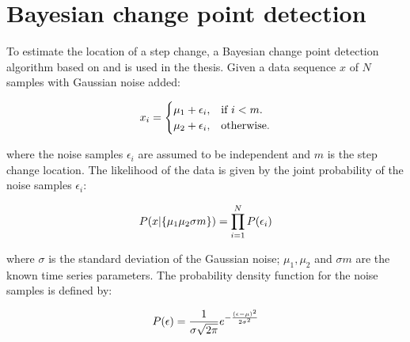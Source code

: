 \chapter{Bayesian change point detection}
\label{appendix:appendix_1} 


To estimate the location of a step change, a Bayesian change point detection algorithm based on \cite{Ruanaidh1996} and \cite{adams2007bayesian} is used in the thesis. Given a data sequence $x$ of $N$ samples with Gaussian noise added:

\begin{equation}
    \centering
      x_i=\begin{cases}
          \mu_1 + \epsilon_i, & \text{if $i<m$}.\\
          \mu_2 + \epsilon_i, & \text{otherwise}.
          \end{cases}
    \label{eq:app:cp:5.1}
\end{equation}

where the noise samples $\epsilon_i$ are assumed to be independent and $m$ is the step change location. The likelihood of the data is given by the joint probability of the noise samples $\epsilon_i$: 

\begin{equation}
    \centering
    P(x|\{\mu_1\mu_2\sigma m\}) = \prod\limits_{i=1}^N P(\epsilon_i)
    \label{eq:app:cp:5.2}
\end{equation}

where $\sigma$ is the standard deviation of the Gaussian noise;  $\mu_1, \mu_2$ and $\sigma m$ are the known time series parameters. The probability density function for the noise samples is defined by:

\begin{equation}
    \centering
    P(\epsilon) = \frac{1}{\sigma \sqrt{2 \pi} }  e ^{ - \frac{ (\epsilon - \mu)^2 } {2\sigma^2} }
    \label{eq:app:cp:noise_pdf}
\end{equation}

\lipsum[12-17]